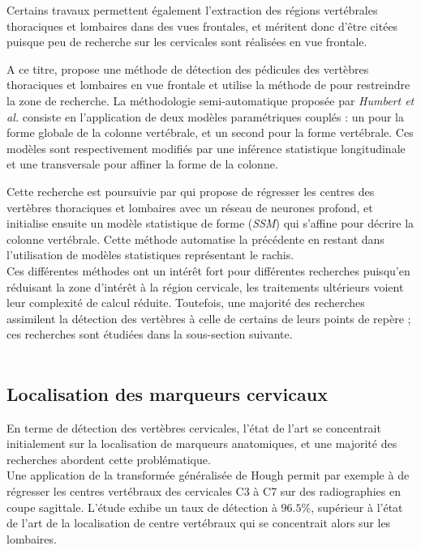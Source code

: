         Certains travaux permettent également l'extraction des régions vertébrales thoraciques et lombaires dans des vues frontales, et méritent donc d'être citées puisque peu de recherche sur les cervicales sont réalisées en vue frontale.

        A ce titre, \cite{Ebrahimi2018} propose une méthode de détection des pédicules des vertèbres thoraciques et lombaires en vue frontale et utilise la méthode de \cite{Humbert2009} pour restreindre la zone de recherche. La méthodologie semi-automatique proposée par {\itshape Humbert et al.} consiste en l'application de deux modèles paramétriques couplés : un pour la forme globale de la colonne vertébrale, et un second pour la forme vertébrale. Ces modèles sont respectivement modifiés par une inférence statistique \og longitudinale \fg et une \og transversale \fg pour affiner la forme de la colonne.

        Cette recherche est poursuivie par \cite{Aubert2016} qui propose de régresser les centres des vertèbres thoraciques et lombaires avec un réseau de neurones profond, et initialise ensuite un modèle statistique de forme ({\itshape SSM}) qui s'affine pour décrire la colonne vertébrale. Cette méthode automatise la précédente en restant dans l'utilisation de modèles statistiques représentant le rachis.
        \\

        Ces différentes méthodes ont un intérêt fort pour différentes recherches puisqu'en réduisant la zone d'intérêt à la région cervicale, les traitements ultérieurs voient leur complexité de calcul réduite. Toutefois, une majorité des recherches assimilent la détection des vertèbres à celle de certains de leurs points de repère ; ces recherches sont étudiées dans la sous-section suivante.
        \\\\

    \subsection{Localisation des marqueurs cervicaux}

        En terme de détection des vertèbres cervicales, l'état de l'art se concentrait initialement sur la localisation de marqueurs anatomiques, et une majorité des recherches abordent cette problématique.
        \\

        Une application de la transformée généralisée de Hough permit par exemple à \cite{Lahrmam2012} de régresser les centres vertébraux des cervicales C3 à C7 sur des radiographies en coupe sagittale. L'étude exhibe un taux de détection à $96.5\%$, supérieur à l'état de l'art de la localisation de centre vertébraux qui se concentrait alors sur les lombaires.


